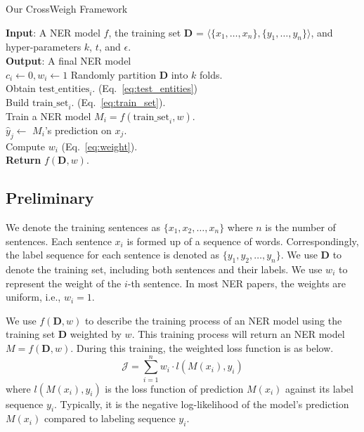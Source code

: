 \documentclass[11pt,a4paper]{article}
\begin{document}
\SetAlgoSkip{}
\begin{algorithm}[t]
    \caption{Our CrossWeigh Framework}\label{alg:model_algo}
    \textbf{Input}: A NER model $f$, the training set $\mathbf{D}$ = $\langle \{x_1, \ldots, x_n\}, \{y_1, \ldots, y_n\} \rangle$, and hyper-parameters $k$, $t$, and $\epsilon$. \\
    \textbf{Output}: A final NER model \\
     {
        $c_i \leftarrow 0, w_i \leftarrow 1$
    }
     {
        Randomly partition $\mathbf{D}$ into $k$ folds. \\
         {
            Obtain $\mbox{test\_entities}_i$. (Eq.~\ref{eq:test_entities})\\
            Build $\mbox{train\_set}_i$. (Eq.~\ref{eq:train_set}).\\
            Train a NER model $M_i = f(\mbox{train\_set}_i, w)$.\\
             {
                $\hat{y}_j \leftarrow$ $M_i$'s prediction on $x_j$.\\
            }
        }
    }
     {
        Compute $w_i$ (Eq.~\ref{eq:weight}). \\
    }
    \textbf{Return} $f(\mathbf{D}, w)$.\\
\end{algorithm} 
    \subsection{Preliminary}
        We denote the training sentences as $\{x_1, x_2, \ldots, x_n\}$ where $n$ is the number of sentences. 
        Each sentence $x_i$ is formed up of a sequence of words.
        Correspondingly, the label sequence for each sentence is denoted as $\{y_1, y_2, \ldots, y_n\}$.
        We use $\mathbf{D}$ to denote the training set, including both sentences and their labels.
        We use $w_i$ to represent the weight of the $i$-th sentence.
        In most NER papers, the weights are uniform, i.e., $w_i = 1$.
        
        We use $f(\mathbf{D}, w)$ to describe the training process of an NER model using the training set $\mathbf{D}$ weighted by $w$. 
        This training process will return an NER model $M = f(\mathbf{D}, w)$.
        During this training, the weighted loss function is as below.
        \begin{equation}
            \mathcal{J} = \sum_{i = 1}^{n} w_i \cdot l(M(x_i), y_i)
        \end{equation}
        where $l(M(x_i), y_i)$ is the loss function of prediction $M(x_i)$ against its label sequence $y_i$.
        Typically, it is the negative log-likelihood of the model's prediction $M(x_i)$ compared to labeling sequence $y_i$.
        
\end{document}

